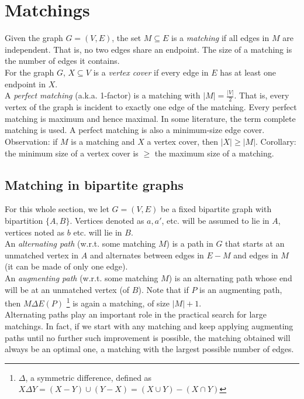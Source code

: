 
\chapter{Matchings}
Given the graph $G = (V, E)$, the set $M \subseteq E$ is a \textit{matching} if all edges in $M$ are independent. That is, no two edges share an endpoint. The size of a matching is the number of edges it contains.\\

For the graph $G$, $X \subseteq V$ is a \textit{vertex cover} if every edge in $E$ has at least one endpoint in $X$.\\

A \textit{perfect matching} (a.k.a. 1-factor) is a matching with $|M| = \frac{|V|}{2}$.
That is, every vertex of the graph is incident to exactly one edge of the matching. Every perfect matching is maximum and hence maximal. In some literature, the term complete matching is used. A perfect matching is also a minimum-size edge cover. \\

Observation: if $M$ is a matching and $X$ a vertex cover, then $|X| \geq |M|$. Corollary: the minimum size of a vertex cover is $\geq$ the maximum size of a matching.

\section{Matching in bipartite graphs}
For this whole section, we let $G = (V, E)$ be a fixed bipartite graph with bipartition $\{A, B \}$. Vertices denoted as $a, a'$, etc. will be assumed to lie in $A$, vertices noted as $b$ etc. will lie in $B$.\\

An \textit{alternating path} (w.r.t. some matching $M$) is a path in $G$ that starts at an unmatched vertex in $A$ and alternates between edges in $E-M$ and edges in $M$ (it can be made of only one edge).\\

An \textit{augmenting path} (w.r.t. some matching $M$) is an alternating path whose end will be at an unmatched vertex (of $B$). Note that if $P$ is an augmenting path, then $M \Delta E(P)$ \footnote{$\Delta$, a symmetric difference, defined as $X \Delta Y = (X-Y) \cup (Y-X) = (X \cup Y) - (X \cap Y)$} is again a matching, of size $|M| + 1$. \\

Alternating paths play an important role in the practical search for large matchings. In fact, if we start with any matching and keep applying augmenting paths until no further such improvement is possible, the matching obtained will always be an optimal one, a matching with the largest possible number of edges.

